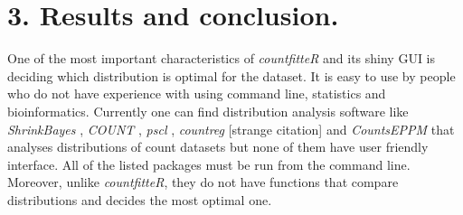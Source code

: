 % 
% 


\section{3. Results and conclusion.}

One of the most important characteristics of \emph{countfitteR} and its shiny GUI is deciding which distribution is optimal for the dataset. It is easy to use by people who do not have experience with using command line, statistics and bioinformatics. 
Currently one can find distribution analysis software like \emph{ShrinkBayes} \citep{shrinkbayes}, \emph{COUNT} \citep{hilbe_modeling_2014, hilbe_negative_2011-1}, \emph{pscl} \citep{pscl}, \emph{countreg} [strange citation] and \emph{CountsEPPM} \citep{countseppm} that analyses distributions of count datasets but none of them have user friendly interface. All of the listed packages must be run from the command line. Moreover, unlike \emph{countfitteR}, they do not have functions that compare distributions and decides the most optimal one.

